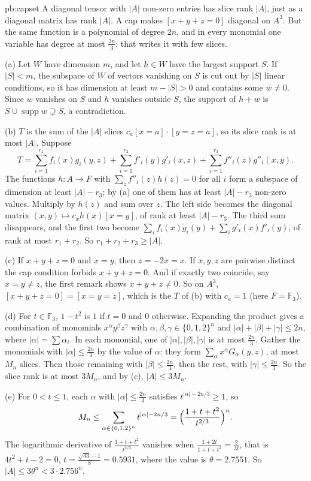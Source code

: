 \begin{solution}{pb:capset}
\idea A diagonal tensor with $|A|$ non-zero entries has slice rank $|A|$, just as a diagonal matrix has rank $|A|$. A cap makes
$[x+y+z=0]$ diagonal on $A^3$. But the same function is a polynomial of degree $2n$, and in every monomial one variable has degree
at most $\frac{2n}3$: that writes it with few slices.

\writeup (a) Let $W$ have dimension $m$, and let $h\in W$ have the largest support $S$. If $|S|<m$, the subspace of $W$ of vectors
vanishing on $S$ is cut out by $|S|$ linear conditions, so it has dimension at least $m-|S|>0$ and contains some $w\ne0$. Since $w$
vanishes on $S$ and $h$ vanishes outside $S$, the support of $h+w$ is $S\cup\operatorname{supp}w\supsetneq S$, a contradiction.

(b) $T$ is the sum of the $|A|$ slices $c_a[x=a]\cdot[y=z=a]$, so its slice rank is at most $|A|$. Suppose
\[
T=\sum_{i=1}^{r_1}f_i(x)g_i(y,z)+\sum_{i=1}^{r_2}f'_i(y)g'_i(x,z)+\sum_{i=1}^{r_3}f''_i(z)g''_i(x,y).
\]
The functions $h:A\to F$ with $\sum_zf''_i(z)h(z)=0$ for all $i$ form a subspace of dimension at least $|A|-r_3$; by (a) one of
them has at least $|A|-r_3$ non-zero values. Multiply by $h(z)$ and sum over $z$. The left side becomes the diagonal matrix
$(x,y)\mapsto c_xh(x)[x=y]$, of rank at least $|A|-r_3$. The third sum disappears, and the first two become
$\sum_if_i(x)\tilde g_i(y)+\sum_i\tilde g'_i(x)f'_i(y)$, of rank at most $r_1+r_2$. So $r_1+r_2+r_3\ge|A|$.

(c) If $x+y+z=0$ and $x=y$, then $z=-2x=x$. If $x,y,z$ are pairwise distinct the cap condition forbids $x+y+z=0$. And if exactly
two coincide, say $x=y\ne z$, the first remark shows $x+y+z\ne0$. So on $A^3$, $[x+y+z=0]=[x=y=z]$, which is the $T$ of (b) with
$c_a=1$ (here $F=\mathbb F_3$).

(d) For $t\in\mathbb F_3$, $1-t^2$ is $1$ if $t=0$ and $0$ otherwise. Expanding the product gives a combination of monomials
$x^\alpha y^\beta z^\gamma$ with $\alpha,\beta,\gamma\in\{0,1,2\}^n$ and $|\alpha|+|\beta|+|\gamma|\le2n$, where
$|\alpha|=\sum\alpha_i$. In each monomial, one of $|\alpha|,|\beta|,|\gamma|$ is at most $\frac{2n}3$. Gather the monomials with
$|\alpha|\le\frac{2n}3$ by the value of $\alpha$: they form $\sum_\alpha x^\alpha G_\alpha(y,z)$, at most $M_n$ slices. Then those
remaining with $|\beta|\le\frac{2n}3$, then the rest, with $|\gamma|\le\frac{2n}3$. So the slice rank is at most $3M_n$, and by (c),
$|A|\le3M_n$.

(e) For $0<t\le1$, each $\alpha$ with $|\alpha|\le\frac{2n}3$ satisfies $t^{|\alpha|-2n/3}\ge1$, so
\[
M_n\le\sum_{\alpha\in\{0,1,2\}^n}t^{|\alpha|-2n/3}=\Bigl(\frac{1+t+t^2}{t^{2/3}}\Bigr)^n.
\]
The logarithmic derivative of $\frac{1+t+t^2}{t^{2/3}}$ vanishes when $\frac{1+2t}{1+t+t^2}=\frac2{3t}$, that is $4t^2+t-2=0$,
$t=\frac{\sqrt{33}-1}8=0.5931$, where the value is $\theta=2.7551$. So $|A|\le3\theta^n<3\cdot2.756^n$.


\end{solution}
